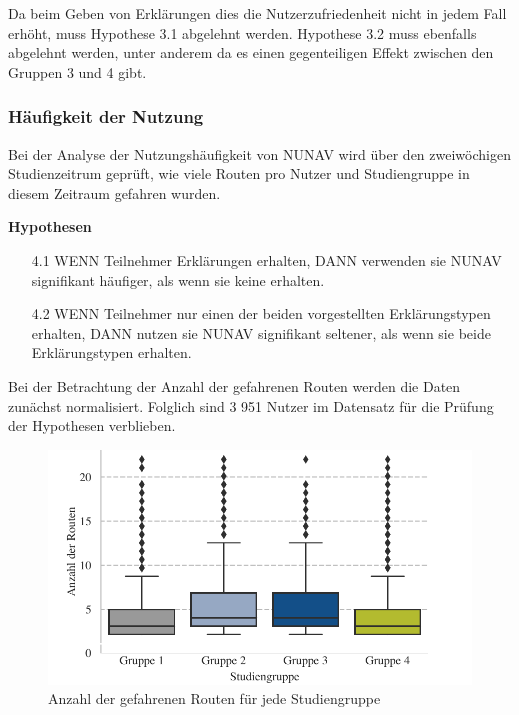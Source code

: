 Da beim Geben von Erklärungen dies die Nutzerzufriedenheit nicht in jedem Fall erhöht, muss Hypothese 3.1 abgelehnt werden. Hypothese 3.2 muss ebenfalls abgelehnt werden, unter anderem da es einen gegenteiligen Effekt zwischen den Gruppen 3 und 4 gibt.

\subsubsection{Häufigkeit der Nutzung}
\label{sec:06_model_evaluation:usage_analysis}

Bei der Analyse der Nutzungshäufigkeit von NUNAV wird über den zweiwöchigen Studienzeitrum geprüft, wie viele Routen pro Nutzer und Studiengruppe in diesem Zeitraum gefahren wurden.

\textbf{Hypothesen}

\begin{enumerate}
    \item[4.1] WENN Teilnehmer Erklärungen erhalten, DANN verwenden sie NUNAV signifikant häufiger, als wenn sie keine erhalten.
    \item[4.2] WENN Teilnehmer nur einen der beiden vorgestellten Erklärungstypen erhalten, DANN nutzen sie NUNAV signifikant seltener, als wenn sie beide Erklärungstypen erhalten.
\end{enumerate}

Bei der Betrachtung der Anzahl der gefahrenen Routen werden die Daten zunächst normalisiert. Folglich sind 3 951 Nutzer im Datensatz für die Prüfung der Hypothesen verblieben.

\begin{figure}
    \centering
    \includegraphics[width=\textwidth]{contents/06_model_evaluation/02_evaluation/res/usage_result_overview.pdf}
    \caption{Anzahl der gefahrenen Routen für jede Studiengruppe}
\end{figure}

